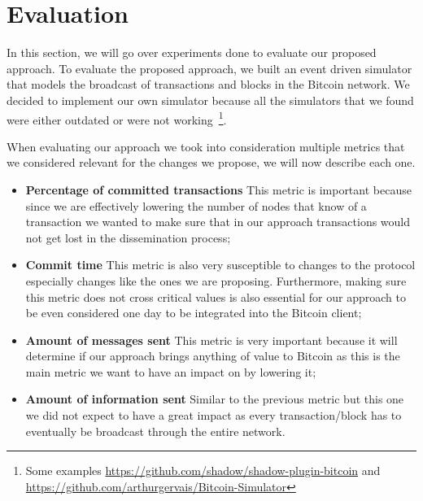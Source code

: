 \chapter{Evaluation}
\label{chap:evaluation}
In this section, we will go over experiments done to evaluate our proposed approach. To evaluate the proposed approach, we built an event driven simulator that models the broadcast of transactions and blocks in the Bitcoin network. We decided to implement our own simulator because all the simulators that we found were either outdated or were not working~\footnote{Some examples \url{https://github.com/shadow/shadow-plugin-bitcoin} and \url{https://github.com/arthurgervais/Bitcoin-Simulator}}.

When evaluating our approach we took into consideration multiple metrics that we considered relevant for the changes we propose, we will now describe each one.
\begin{itemize}
	\item \textbf{Percentage of committed transactions} This metric is important because since we are effectively lowering the number of nodes that know of a transaction we wanted to make sure that in our approach transactions would not get lost in the dissemination process;
	\item \textbf{Commit time} This metric is also very susceptible to changes to the protocol especially changes like the ones we are proposing. Furthermore, making sure this metric does not cross critical values is also essential for our approach to be even considered one day to be integrated into the Bitcoin client;
	\item \textbf{Amount of messages sent} This metric is very important because it will determine if our approach brings anything of value to Bitcoin as this is the main metric we want to have an impact on by lowering it;
	\item \textbf{Amount of information sent} Similar to the previous metric but this one we did not expect to have a great impact as every transaction/block has to eventually be broadcast through the entire network.
\end{itemize}

